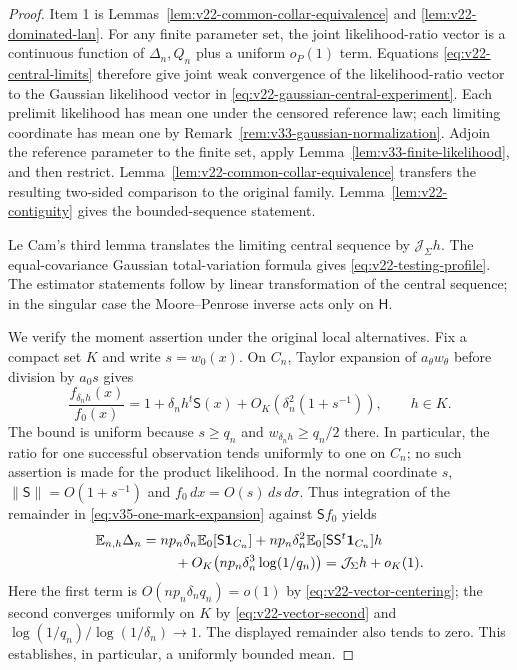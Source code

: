 \begin{proof}
Item 1 is Lemmas~\ref{lem:v22-common-collar-equivalence} and
\ref{lem:v22-dominated-lan}.  For any finite parameter set, the joint
likelihood-ratio vector is a continuous function of $\Delta_n,Q_n$ plus a
uniform $o_P(1)$ term.  Equations \eqref{eq:v22-central-limits} therefore give
joint weak convergence of the likelihood-ratio vector to the Gaussian
likelihood vector in \eqref{eq:v22-gaussian-central-experiment}.  Each
prelimit likelihood has mean one under the censored reference law; each
limiting coordinate has mean one by
Remark~\ref{rem:v33-gaussian-normalization}.  Adjoin the reference
parameter to the finite set, apply Lemma~\ref{lem:v33-finite-likelihood},
and then restrict.  Lemma~\ref{lem:v22-common-collar-equivalence}
transfers the resulting two-sided comparison to the original family.
Lemma~\ref{lem:v22-contiguity} gives the bounded-sequence statement.

Le Cam's third lemma translates the limiting central sequence by
$\mathcal J_\Sigma h$.  The equal-covariance Gaussian total-variation formula
gives \eqref{eq:v22-testing-profile}.  The estimator statements follow by
linear transformation of the central sequence; in the singular case the
Moore--Penrose inverse acts only on $\mathsf H$.

We verify the moment assertion under the original local alternatives.
Fix a compact set $K$ and write $s=w_0(x)$.  On $C_n$, Taylor expansion
of $a_\theta w_\theta$ before division by $a_0s$ gives
\begin{equation}\label{eq:v35-one-mark-expansion}
 \frac{f_{\delta_nh}(x)}{f_0(x)}
 =1+\delta_nh^t\mathsf S(x)
       +O_K\!\left(\delta_n^2(1+s^{-1})\right),
 \qquad h\in K.
\end{equation}
The bound is uniform because $s\ge q_n$ and
$w_{\delta_nh}\ge q_n/2$ there.  In particular, the ratio for one
successful observation tends uniformly to one on $C_n$; no such assertion
is made for the product likelihood.  In the normal coordinate $s$,
$\|\mathsf S\|=O(1+s^{-1})$ and $f_0\,dx=O(s)\,ds\,d\sigma$.
Thus integration of the remainder in
\eqref{eq:v35-one-mark-expansion} against $\mathsf S f_0$ yields
\begin{align}
 \mathbb E_{n,h}\Delta_n
 ={}&np_n\delta_n\mathbb E_0[\mathsf S\mathbf1_{C_n}]
       +np_n\delta_n^2
          \mathbb E_0[\mathsf S\mathsf S^t\mathbf1_{C_n}]h
       \notag\\
    &\quad+O_K\!\left(np_n\delta_n^3\log(1/q_n)\right)
       =\mathcal J_\Sigma h+o_K(1).
                                      \label{eq:v35-alternative-mean}
\end{align}
Here the first term is $O(np_n\delta_nq_n)=o(1)$ by
\eqref{eq:v22-vector-centering}; the second converges uniformly on $K$
by \eqref{eq:v22-vector-second} and
$\log(1/q_n)/\log(1/\delta_n)\to1$.  The displayed remainder also
tends to zero.  This establishes, in particular, a uniformly bounded mean.


\end{proof}
